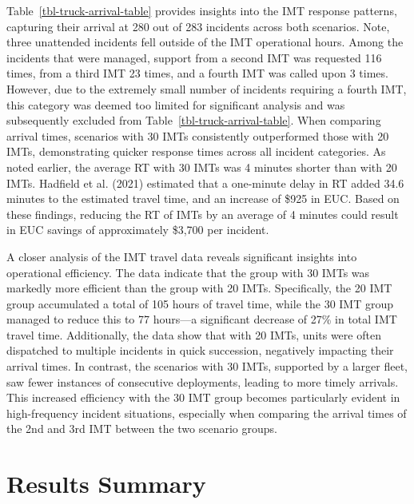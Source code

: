 \documentclass[fancy, oneside, mastersfancy, ms]{byuthesis}
\begin{document}
Table~\ref{tbl-truck-arrival-table} provides insights into the IMT
response patterns, capturing their arrival at 280 out of 283 incidents
across both scenarios. Note, three unattended incidents fell outside of
the IMT operational hours. Among the incidents that were managed,
support from a second IMT was requested 116 times, from a third IMT 23
times, and a fourth IMT was called upon 3 times. However, due to the
extremely small number of incidents requiring a fourth IMT, this
category was deemed too limited for significant analysis and was
subsequently excluded from Table~\ref{tbl-truck-arrival-table}. When
comparing arrival times, scenarios with 30 IMTs consistently
outperformed those with 20 IMTs, demonstrating quicker response times
across all incident categories. As noted earlier, the average RT with 30
IMTs was 4 minutes shorter than with 20 IMTs. Hadfield et al. (2021)
estimated that a one-minute delay in RT added 34.6 minutes to the
estimated travel time, and an increase of \$925 in EUC. Based on these
findings, reducing the RT of IMTs by an average of 4 minutes could
result in EUC savings of approximately \$3,700 per incident.

A closer analysis of the IMT travel data reveals significant insights
into operational efficiency. The data indicate that the group with 30
IMTs was markedly more efficient than the group with 20 IMTs.
Specifically, the 20 IMT group accumulated a total of 105 hours of
travel time, while the 30 IMT group managed to reduce this to 77
hours---a significant decrease of 27\% in total IMT travel time.
Additionally, the data show that with 20 IMTs, units were often
dispatched to multiple incidents in quick succession, negatively
impacting their arrival times. In contrast, the scenarios with 30 IMTs,
supported by a larger fleet, saw fewer instances of consecutive
deployments, leading to more timely arrivals. This increased efficiency
with the 30 IMT group becomes particularly evident in high-frequency
incident situations, especially when comparing the arrival times of the
2nd and 3rd IMT between the two scenario groups.

\hypertarget{results-summary}{%
\section{Results Summary}\label{results-summary}}
\end{document}

